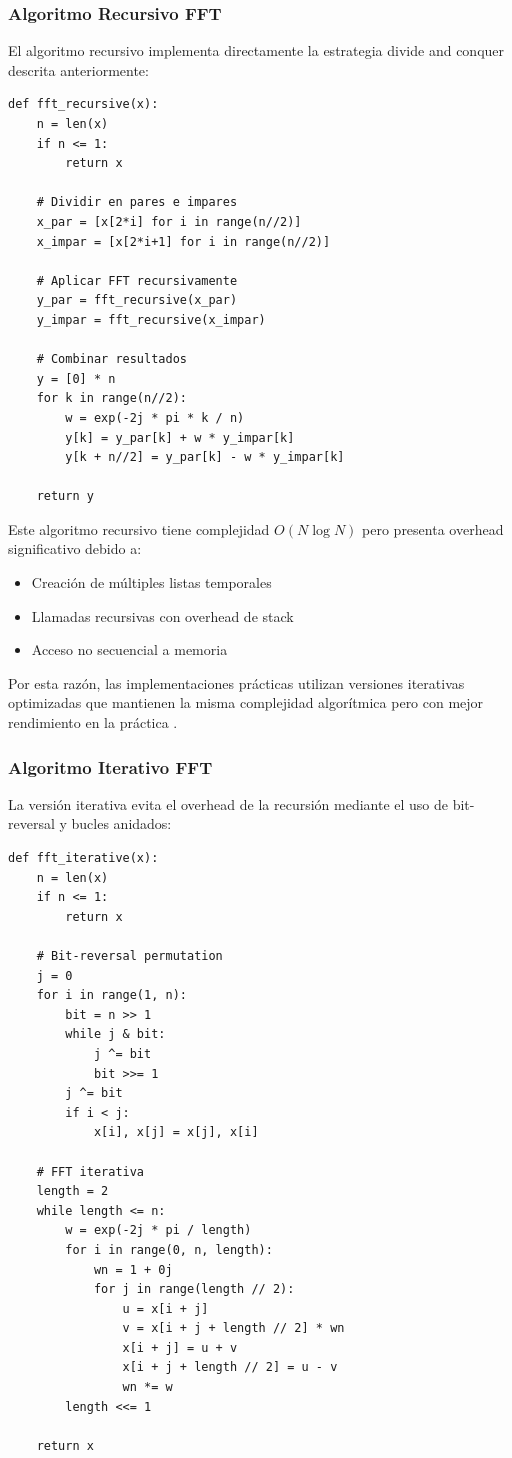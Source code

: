 \documentclass[a4paper]{article}
\begin{document}
\subsubsection{Algoritmo Recursivo FFT}

El algoritmo recursivo implementa directamente la estrategia divide and conquer descrita anteriormente:

\begin{verbatim}
def fft_recursive(x):
    n = len(x)
    if n <= 1:
        return x
    
    # Dividir en pares e impares
    x_par = [x[2*i] for i in range(n//2)]
    x_impar = [x[2*i+1] for i in range(n//2)]
    
    # Aplicar FFT recursivamente
    y_par = fft_recursive(x_par)
    y_impar = fft_recursive(x_impar)
    
    # Combinar resultados
    y = [0] * n
    for k in range(n//2):
        w = exp(-2j * pi * k / n)
        y[k] = y_par[k] + w * y_impar[k]
        y[k + n//2] = y_par[k] - w * y_impar[k]
    
    return y
\end{verbatim}

Este algoritmo recursivo tiene complejidad $O(N \log N)$ pero presenta overhead significativo debido a:
\begin{itemize}
    \item Creación de múltiples listas temporales
    \item Llamadas recursivas con overhead de stack
    \item Acceso no secuencial a memoria
\end{itemize}

Por esta razón, las implementaciones prácticas utilizan versiones iterativas optimizadas que mantienen la misma complejidad algorítmica pero con mejor rendimiento en la práctica \cite{duhamel1990fast}.

\subsubsection{Algoritmo Iterativo FFT}

La versión iterativa evita el overhead de la recursión mediante el uso de bit-reversal y bucles anidados:

\begin{verbatim}
def fft_iterative(x):
    n = len(x)
    if n <= 1:
        return x
    
    # Bit-reversal permutation
    j = 0
    for i in range(1, n):
        bit = n >> 1
        while j & bit:
            j ^= bit
            bit >>= 1
        j ^= bit
        if i < j:
            x[i], x[j] = x[j], x[i]
    
    # FFT iterativa
    length = 2
    while length <= n:
        w = exp(-2j * pi / length)
        for i in range(0, n, length):
            wn = 1 + 0j
            for j in range(length // 2):
                u = x[i + j]
                v = x[i + j + length // 2] * wn
                x[i + j] = u + v
                x[i + j + length // 2] = u - v
                wn *= w
        length <<= 1
    
    return x
\end{verbatim}
\end{document}
